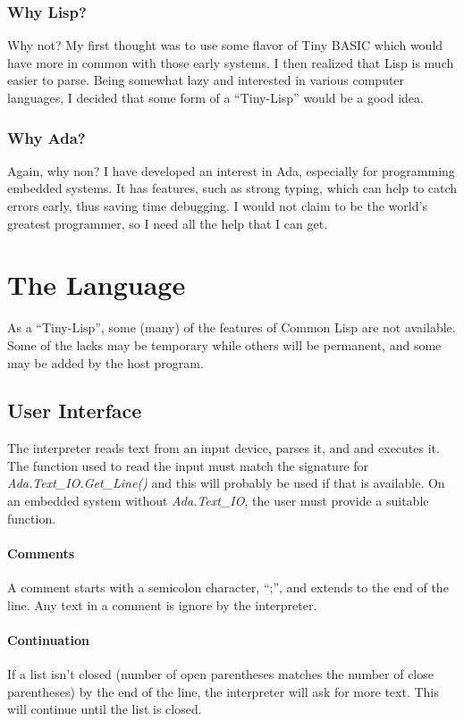 \documentclass[10pt, openany]{book}
\begin{document}
\subsection{Why Lisp?}
Why not?  My first thought was to use some flavor of Tiny BASIC which would have more in common with those early systems.  I then realized that Lisp is much easier to parse.  Being somewhat lazy and interested in various computer languages, I decided that some form of a ``Tiny-Lisp'' would be a good idea.

\subsection{Why Ada?}
Again, why non?  I have developed an interest in Ada, especially for programming embedded systems.  It has features, such as strong typing, which can help to catch errors early, thus saving time debugging.  I would not claim to be the world's greatest programmer, so I need all the help that I can get.

\chapter{The Language}
As a ``Tiny-Lisp'', some (many) of the features of Common Lisp are not available.  Some of the lacks may be temporary while others will be permanent, and some may be added by the host program.

\section{User Interface}
The interpreter reads text from an input device, parses it, and and executes it.  The function used to read the input must match the signature for \emph{Ada.Text\_IO.Get\_Line()} and this will probably be used if that is available.  On an embedded system without \emph{Ada.Text\_IO}, the user must provide a suitable function.

\subsubsection{Comments}
A comment starts with a semicolon character, ``;'', and extends to the end of the line.  Any text in a comment is ignore by the interpreter.

\subsubsection{Continuation}
If a list isn't closed (number of open parentheses matches the number of close parentheses) by the end of the line, the interpreter will ask for more text.  This will continue until the list is closed.
\end{document}
